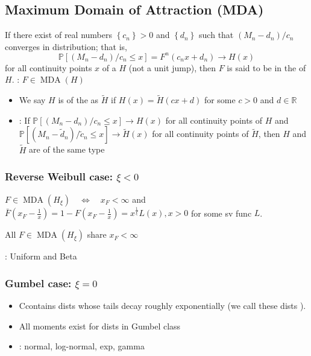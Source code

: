\subsection*{Maximum Domain of Attraction (MDA)}
If there exist  of real numbers $\left\{c_{n}\right\}>0$ and $\left\{d_{n}\right\}$ such that $\left(M_{n}-d_{n}\right) / c_{n}$ converges in distribution; that is,
$$ 
\mathbb{P}\left[\left(M_{n}-d_{n}\right) / c_{n} \leq x\right]=F^{n}\left(c_{n} x+d_{n}\right) \rightarrow H(x)
$$
for all continuity points $x$ of a  $H$ (not a unit jump), then $F$ is said to be in the  of $H$. : $F \in \operatorname{MDA}(H)$

\begin{itemize}[leftmargin=*]
    \item We say $H$ is of the  as $\tilde{H}$ if $H(x)=\tilde{H}(c x+d)$ for some $c>0$ and $d \in \mathbb{R}$
    \item {}:
If $\mathbb{P}\left[\left(M_{n}-d_{n}\right) / c_{n} \leq x\right] \rightarrow H(x)$ for all continuity points of $H$ and $\mathbb{P}\left[\left(M_{n}-\tilde{d}_{n}\right) / \tilde{c}_{n} \leq x\right] \rightarrow \tilde{H}(x)$ for all continuity points of $\tilde{H}$, then $H$ and $\tilde{H}$ are of the same type
\end{itemize}

\subsubsection*{Reverse Weibull case: $\xi<0$}
$F \in \operatorname{MDA}\left(H_{\xi}\right) \quad \Leftrightarrow \quad x_{F}<\infty$ and $\bar{F}\left(x_{F}-\frac{1}{x}\right)=1-F\left(x_{F}-\frac{1}{x}\right)=x^{\frac{1}{\xi}} L(x), x>0$ for some sv func $L$.

All $F \in \operatorname{MDA}\left(H_{\xi}\right)$ share $x_{F}<\infty$

: Uniform and Beta
\subsubsection*{Gumbel case: $\xi=0$}
\begin{itemize}[leftmargin=*]
    \item Ccontains dists whose tails decay roughly exponentially (we call these dists ).
    \item All moments exist for dists in Gumbel class
    \item {}: normal, log-normal, exp, gamma
\end{itemize}

